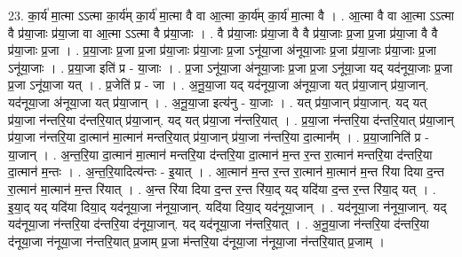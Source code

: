 \documentclass[17pt]{extarticle}
\begin{document}
23. का॒र्य॑ मा॒त्मा ऽऽत्मा का॒र्य॑म् का॒र्य॑ मा॒त्मा वै वा आ॒त्मा का॒र्य॑म् का॒र्य॑ मा॒त्मा वै । . आ॒त्मा वै वा आ॒त्मा ऽऽत्मा वै प्र॑या॒जाः प्र॑या॒जा वा आ॒त्मा ऽऽत्मा वै प्र॑या॒जाः । . वै प्र॑या॒जाः प्र॑या॒जा वै वै प्र॑या॒जाः प्र॒जा प्र॒जा प्र॑या॒जा वै वै प्र॑या॒जाः प्र॒जा । . प्र॒या॒जाः प्र॒जा प्र॒जा प्र॑या॒जाः प्र॑या॒जाः प्र॒जा ऽनू॑या॒जा अ॑नूया॒जाः प्र॒जा प्र॑या॒जाः प्र॑या॒जाः प्र॒जा ऽनू॑या॒जाः । . प्र॒या॒जा इति॑ प्र - या॒जाः । . प्र॒जा ऽनू॑या॒जा अ॑नूया॒जाः प्र॒जा प्र॒जा ऽनू॑या॒जा यद् यद॑नूया॒जाः प्र॒जा प्र॒जा ऽनू॑या॒जा यत् । . प्र॒जेति॑ प्र - जा । . अ॒नू॒या॒जा यद् यद॑नूया॒जा अ॑नूया॒जा यत् प्र॑या॒जान् प्र॑या॒जान्. यद॑नूया॒जा अ॑नूया॒जा यत् प्र॑या॒जान् । . अ॒नू॒या॒जा इत्य॑नु - या॒जाः । . यत् प्र॑या॒जान् प्र॑या॒जान्. यद् यत् प्र॑या॒जा न॑न्तरि॒या द॑न्तरि॒यात् प्र॑या॒जान्. यद् यत् प्र॑या॒जा न॑न्तरि॒यात् । . प्र॒या॒जा न॑न्तरि॒या द॑न्तरि॒यात् प्र॑या॒जान् प्र॑या॒जा न॑न्तरि॒या दा॒त्मान॑ मा॒त्मान॑ मन्तरि॒यात् प्र॑या॒जान् प्र॑या॒जा न॑न्तरि॒या दा॒त्मान᳚म् । . प्र॒या॒जानिति॑ प्र - या॒जान् । . अ॒न्त॒रि॒या दा॒त्मान॑ मा॒त्मान॑ मन्तरि॒या द॑न्तरि॒या दा॒त्मान॑ म॒न्त र॒न्त रा॒त्मान॑ मन्तरि॒या द॑न्तरि॒या दा॒त्मान॑ म॒न्तः । . अ॒न्त॒रि॒यादित्य॑न्तः - इ॒यात् । . आ॒त्मान॑ म॒न्त र॒न्त रा॒त्मान॑ मा॒त्मान॑ म॒न्त रि॑या दिया द॒न्त रा॒त्मान॑ मा॒त्मान॑ म॒न्त रि॑यात् । . अ॒न्त रि॑या दिया द॒न्त र॒न्त रि॑या॒द् यद् यदि॑या द॒न्त र॒न्त रि॑या॒द् यत् । . इ॒या॒द् यद् यदि॑या दिया॒द् यद॑नूया॒जा न॑नूया॒जान्. यदि॑या दिया॒द् यद॑नूया॒जान् । . यद॑नूया॒जा न॑नूया॒जान्. यद् यद॑नूया॒जा न॑न्तरि॒या द॑न्तरि॒या द॑नूया॒जान्. यद् यद॑नूया॒जा न॑न्तरि॒यात् । . अ॒नू॒या॒जा न॑न्तरि॒या द॑न्तरि॒या द॑नूया॒जा न॑नूया॒जा न॑न्तरि॒यात् प्र॒जाम् प्र॒जा म॑न्तरि॒या द॑नूया॒जा न॑नूया॒जा न॑न्तरि॒यात् प्र॒जाम् । \newline
\end{document}
